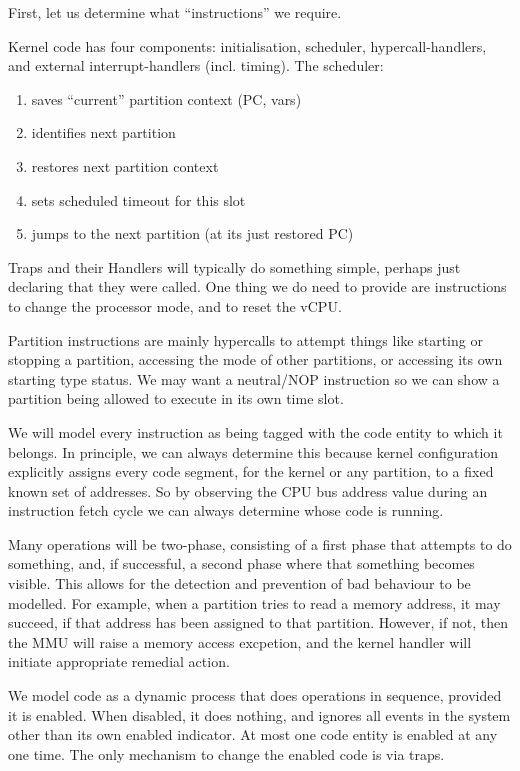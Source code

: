 First, let us determine what ``instructions'' we require.

Kernel code has four components:
initialisation, scheduler, hypercall-handlers,
and external interrupt-handlers (incl. timing).
The scheduler:
\begin{enumerate}
  \item saves ``current'' partition context (PC, vars)
  \item identifies next partition
  \item restores next partition context
  \item sets scheduled timeout for this slot
  \item jumps to the next partition (at its just restored PC)
\end{enumerate}
Traps and their Handlers will typically do something simple,
perhaps just declaring that they were called.
One thing we do need to provide are instructions
to change the processor mode, and to reset the vCPU.

Partition instructions are mainly hypercalls to attempt
things like starting or stopping a partition,
accessing the mode of other partitions,
or accessing its own starting type status.
We may want a neutral/NOP instruction so we can show a partition
being allowed to execute in its own time slot.

We will model every instruction as being tagged with the code entity to
which it belongs.
In principle, we can always determine this because kernel configuration
explicitly assigns every code segment,
for the kernel or any partition,
to a fixed known set of addresses.
So by observing the CPU bus address value during an instruction fetch cycle
we can always determine whose code is running.

Many operations will be two-phase,
consisting of a first phase that attempts to do something,
and, if successful, a second phase where that something becomes visible.
This allows for the detection and prevention of bad behaviour to be modelled.
For example, when a partition tries to read a memory address,
it may succeed, if that address has been assigned to that partition.
However, if not, then the MMU will raise a memory access excpetion,
and the kernel handler will initiate appropriate remedial action.

We model code as a dynamic process that does operations in sequence,
provided it is enabled.
When disabled, it does nothing, and ignores all events in the system
other than its own enabled indicator.
At most one code entity is enabled at any one time.
The only mechanism to change the enabled code is via
traps.

